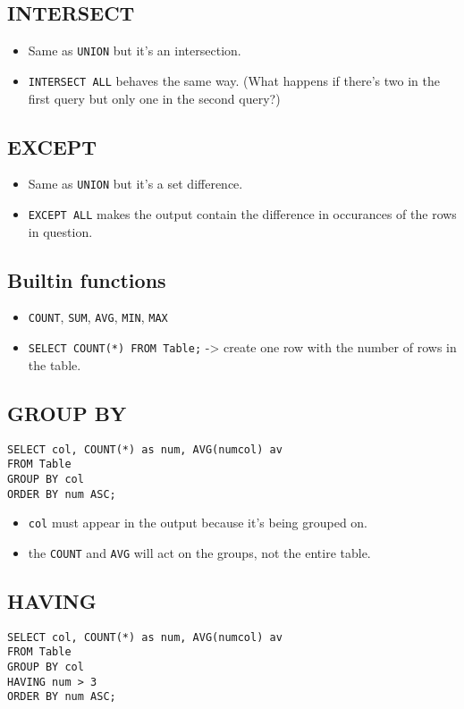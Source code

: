 \documentclass[11pt]{article}
\begin{document}
\subsection{INTERSECT}
\label{sec:org400d824}
\begin{itemize}
\item Same as \texttt{UNION} but it's an intersection.
\item \texttt{INTERSECT ALL} behaves the same way. (What happens if there's two in the
first query but only one in the second query?)
\end{itemize}
\subsection{EXCEPT}
\label{sec:org2c37d82}
\begin{itemize}
\item Same as \texttt{UNION} but it's a set difference.
\item \texttt{EXCEPT ALL} makes the output contain the difference in occurances of the
rows in question.
\end{itemize}
\subsection{Builtin functions}
\label{sec:orgf0ac895}
\begin{itemize}
\item \texttt{COUNT}, \texttt{SUM}, \texttt{AVG}, \texttt{MIN}, \texttt{MAX}
\item \texttt{SELECT COUNT(*) FROM Table;} -> create one row with the number of rows in
the table.
\end{itemize}
\subsection{GROUP BY}
\label{sec:orgbe4a5db}
\begin{verbatim}
SELECT col, COUNT(*) as num, AVG(numcol) av
FROM Table
GROUP BY col
ORDER BY num ASC;
\end{verbatim}

\begin{itemize}
\item \texttt{col} must appear in the output because it's being grouped on.
\item the \texttt{COUNT} and \texttt{AVG} will act on the groups, not the entire table.
\end{itemize}
\subsection{HAVING}
\label{sec:org23ac478}
\begin{verbatim}
SELECT col, COUNT(*) as num, AVG(numcol) av
FROM Table
GROUP BY col
HAVING num > 3
ORDER BY num ASC;
\end{verbatim}
\end{document}
